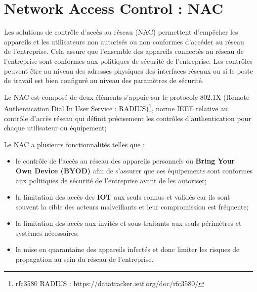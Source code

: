
\section{Network Access Control : NAC}
Les solutions de contrôle d'accès au réseau (NAC) permettent d'empêcher les appareils et les utilisateurs non autorisés ou non conformes d'accéder au réseau de l'entreprise. Cela assure que l'ensemble des appareils connectés au réseau de l'entreprise sont conformes aux politiques de sécurité de l'entreprise. Les contrôles peuvent être au niveau des adresses physiques des interfaces réseaux ou si le poste de travail est bien configuré au niveau des paramètres de sécurité.

Le NAC est composé de deux éléments s'appuie sur le protocole 802.1X (Remote Authentication Dial In User Service : RADIUS)\footnote{rfc3580 RADIUS : https://datatracker.ietf.org/doc/rfc3580/}, norme IEEE relative au contrôle d'accès réseau qui définit précisement les contrôles d'authentication pour chaque utilisateur ou équipement;

Le NAC a plusieurs fonctionnalités telles que : 
\begin{itemize}
\item le contrôle de l'accès au réseau des appareils personnels ou \textbf{Bring Your Own Device (BYOD)} afin de s'assurer que ces équipements sont conformes aux politiques de sécurité de l'entreprise avant de les autoriser;
\item la limitation des accès des \textbf{IOT} aux seuls connus et validés car ils sont souvent la cible des acteurs malveillants et leur compromission est fréquente;
\item la limitation des accès aux invités et sous-traitants aux seuls périmètres et systèmes nécessaires;
\item la mise en quarantaine des appareils infectés et donc limiter les risques de propagation au sein du réseau de l'entreprise.
\end{itemize}

